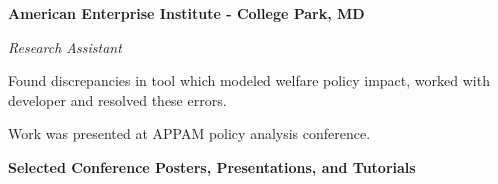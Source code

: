 \documentclass{res}
\begin{document}
{\begin{resume}
\begin{minipage}{7.6in}
\vspace{2mm}
%
%
\textbf{American Enterprise Institute - College Park, MD}

\vspace{0.75mm}
{\it Research Assistant}  
\vspace{0.5mm}
\begin{list}{}{\leftmargin=1em}\itemsep-2pt
\item Found discrepancies in tool which modeled welfare policy impact, worked with developer and resolved these errors.
\item Work was presented at APPAM policy analysis conference.
\end{list}


\vspace{6mm}
\hrulefill\textbf{\hspace{2mm}Selected Conference Posters, Presentations, and Tutorials\hspace{2mm}}\hrulefill
\vspace{2.5mm}
\begin{list}{}{%
     \setlength{\labelwidth}{0pt}%
     \setlength{\itemsep}{-2pt}%
     \setlength{\leftmargin}{1em}%
     \setlength{\itemindent}{-1em}%
   }


\end{list}
\end{minipage}
\end{resume}}
\end{document}

